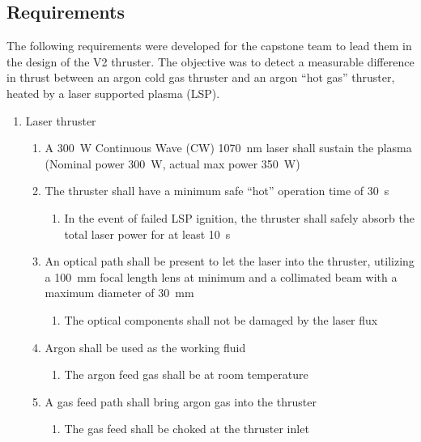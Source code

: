         \subsection{Requirements}

            The following requirements were developed for the capstone team to lead them in the design of the V2 thruster. The objective was to detect a measurable difference in thrust between an argon cold gas thruster and an argon “hot gas” thruster, heated by a laser supported plasma (LSP).

            \begin{enumerate}
                \item Laser thruster
                \begin{enumerate}
                    \item A \qty{300}{W} Continuous Wave (CW) \qty{1070}{nm} laser shall sustain the plasma (Nominal power \qty{300}{W}, actual max power \qty{350}{W})
                    \item The thruster shall have a minimum safe “hot” operation time of \qty{30}{s}
                    \begin{enumerate}
                        \item In the event of failed LSP ignition, the thruster shall safely absorb the total laser power for at least \qty{10}{s}
                    \end{enumerate}
                    \item An optical path shall be present to let the laser into the thruster, utilizing a \qty{100}{mm} focal length lens at minimum and a collimated beam with a maximum diameter of \qty{30}{mm}
                    \begin{enumerate}
                        \item The optical components shall not be damaged by the laser flux
                    \end{enumerate}
                    \item Argon shall be used as the working fluid
                    \begin{enumerate}
                        \item The argon feed gas shall be at room temperature
                    \end{enumerate}
                    \item A gas feed path shall bring argon gas into the thruster
                    \begin{enumerate}
                        \item The gas feed shall be choked at the thruster inlet

\end{enumerate}
\end{enumerate}
\end{enumerate}
